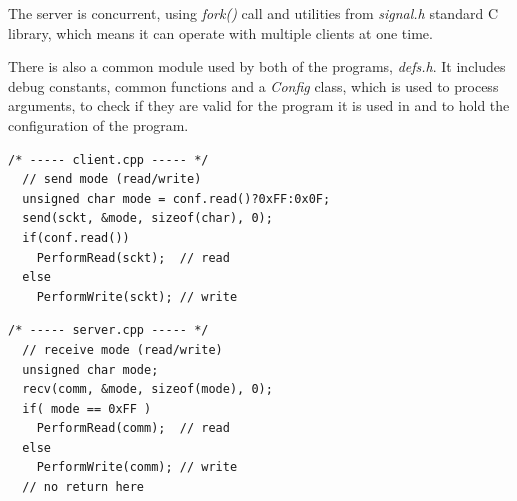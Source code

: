 \documentclass[10pt,a4paper,titlepage]{article}
\begin{document}
The server is concurrent, using {\it fork()} call and utilities from
{\it signal.h} standard C library, which means it can operate with multiple
clients at one time.

There is also a common module used by both of the programs, {\it defs.h}.
It includes debug constants, common functions and a {\it Config} class,
which is used to process arguments, to check if they are valid for the program
it is used in and to hold the configuration of the program.



\begin{multicols}{2}

\begin{lstlisting}[style=CStyle]
  /* ----- client.cpp ----- */
  // send mode (read/write)
  unsigned char mode = conf.read()?0xFF:0x0F;
  send(sckt, &mode, sizeof(char), 0);
  if(conf.read())
    PerformRead(sckt);  // read
  else
    PerformWrite(sckt); // write
\end{lstlisting}

\begin{lstlisting}[style=CStyle]
  /* ----- server.cpp ----- */
  // receive mode (read/write)
  unsigned char mode;
  recv(comm, &mode, sizeof(mode), 0);
  if( mode == 0xFF )
    PerformRead(comm);  // read
  else
    PerformWrite(comm); // write
  // no return here
\end{lstlisting}

\end{multicols}
\printbibliography
\end{document}
